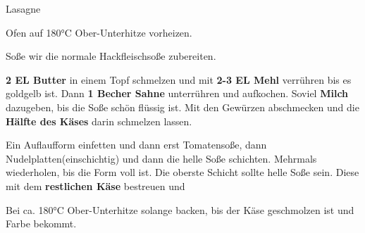 \begin{recipe}[]{Lasagne} %

\step
Ofen auf 180°C Ober-Unterhitze vorheizen.

\step
Soße wir die normale Hackfleischsoße zubereiten.

\step
\textbf{2 EL Butter} in einem Topf schmelzen und mit \textbf{2-3 EL Mehl} verrühren bis es goldgelb ist. Dann \textbf{1 Becher Sahne} unterrühren und aufkochen. Soviel \textbf{Milch} dazugeben, bis die Soße schön flüssig ist. Mit den Gewürzen abschmecken und die \textbf{Hälfte des Käses} darin schmelzen lassen.

\step
Ein Auflaufform einfetten und dann erst Tomatensoße, dann Nudelplatten(einschichtig) und dann die helle Soße schichten. Mehrmals wiederholen, bis die Form voll ist. Die oberste Schicht sollte helle Soße sein. Diese mit dem \textbf{restlichen Käse} bestreuen und 

\step
Bei ca. 180°C Ober-Unterhitze solange backen, bis der Käse geschmolzen ist und Farbe bekommt.





\end{recipe}
